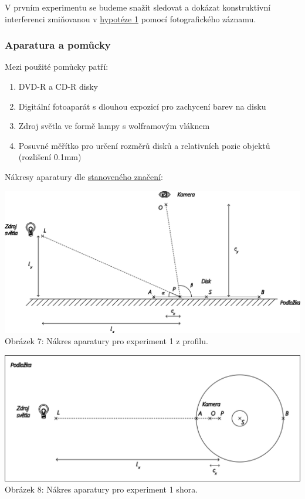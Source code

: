 \documentclass[titlepage]{article}
\begin{document}
V prvním experimentu se budeme snažit sledovat a dokázat konstruktivní interferenci zmiňovanou v \hyperref[hyp:1]{hypotéze 1} pomocí fotografického záznamu.

\subsubsection{Aparatura a pomůcky}

Mezi použité pomůcky patří:
\begin{enumerate}
    \item DVD-R a CD-R disky
    \item Digitální fotoaparát s dlouhou expozicí pro zachycení barev na disku
    \item Zdroj světla ve formě lampy s wolframovým vláknem
    \item Posuvné měřítko pro určení rozměrů disků a relativních pozic objektů (rozlišení 0.1mm)
\end{enumerate}

Nákresy aparatury dle \hyperref[table:1]{stanoveného značení}:

 \label{image:7}
\begin{center}
    \includegraphics[width = \textwidth]{exp1_d1.png}
    \linebreak
    Obrázek 7: Nákres aparatury pro experiment 1 z profilu.
\end{center}

 \label{image:8}
\begin{center}
    \includegraphics[width = \textwidth]{exp1_d2.png}
    \linebreak
    Obrázek 8: Nákres aparatury pro experiment 1 shora.
\end{center}
\end{document}
